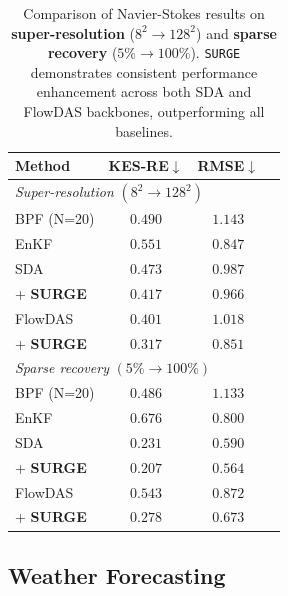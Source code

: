 \documentclass{article}
\theoremstyle{plain}
\theoremstyle{definition}
\theoremstyle{remark}
\begin{document}
\begin{table}[t]
\caption{Comparison of Navier-Stokes results on \textbf{super-resolution} ($8^2 \to 128^2$) and \textbf{sparse recovery} ($5\% \to 100\%$). \texttt{SURGE} demonstrates consistent performance enhancement across both SDA and FlowDAS backbones, outperforming all baselines.}
\label{tab:NSresultstable}
\begin{center}
\begin{small}
\begin{sc}
\begin{tabular}{lccc}
\toprule
Method & KES-RE$\downarrow$ & RMSE$\downarrow$\\
\midrule
\multicolumn{3}{l}{\textit{Super-resolution} $(8^2\rightarrow128^2)$} \\
\midrule
BPF (N=20)              & $0.490$ & $1.143$ \\
EnKF                    & $0.551$ & $0.847$ \\
SDA                     & $0.473$ & $0.987$ \\
\quad + \textbf{SURGE}  & $0.417$ & $0.966$ \\
FlowDAS                 & $0.401$ & $1.018$ \\
\quad + \textbf{SURGE}  & $\mathbf{0.317}$ & $\mathbf{0.851}$ \\
\midrule
\multicolumn{3}{l}{\textit{Sparse recovery} $(5\%\rightarrow100\%)$} \\
\midrule
BPF (N=20)              & $0.486$ & $1.133$ \\
EnKF                    & $0.676$ & $0.800$ \\
SDA                     & $0.231$ & $0.590$ \\
\quad + \textbf{SURGE}  & $\mathbf{0.207}$ & $\mathbf{0.564}$ \\
FlowDAS                 & $0.543$ & $0.872$ \\
\quad + \textbf{SURGE}  & $0.278$ & $0.673$ \\
\bottomrule
\end{tabular}
\end{sc}
\end{small}
\end{center}
\vspace{-0.2in}
\end{table}


\subsection{Weather Forecasting}
\end{document}
